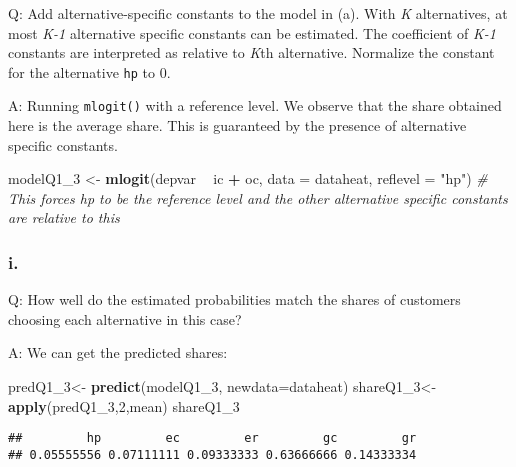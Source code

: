\documentclass[
]{article}
\newenvironment{Shaded}{\begin{snugshade}}{\end{snugshade}}
\newcommand{\CommentTok}[1]{\textcolor[rgb]{0.56,0.35,0.01}{\textit{#1}}}
\newcommand{\DataTypeTok}[1]{\textcolor[rgb]{0.13,0.29,0.53}{#1}}
\newcommand{\DecValTok}[1]{\textcolor[rgb]{0.00,0.00,0.81}{#1}}
\newcommand{\KeywordTok}[1]{\textcolor[rgb]{0.13,0.29,0.53}{\textbf{#1}}}
\newcommand{\NormalTok}[1]{#1}
\newcommand{\OperatorTok}[1]{\textcolor[rgb]{0.81,0.36,0.00}{\textbf{#1}}}
\newcommand{\StringTok}[1]{\textcolor[rgb]{0.31,0.60,0.02}{#1}}
\begin{document}
Q: Add alternative-specific constants to the model in (a). With \emph{K}
alternatives, at most \emph{K-1} alternative specific constants can be
estimated. The coefficient of \emph{K-1} constants are interpreted as
relative to \emph{K}th alternative. Normalize the constant for the
alternative \texttt{hp} to 0.


A: Running \texttt{mlogit()} with a reference level. We observe that the
share obtained here is the average share. This is guaranteed by the
presence of alternative specific constants.

\begin{Shaded}
\begin{Highlighting}[]
\NormalTok{modelQ1_}\DecValTok{3}\NormalTok{ <-}\StringTok{ }\KeywordTok{mlogit}\NormalTok{(depvar }\OperatorTok{~}\StringTok{ }\NormalTok{ic }\OperatorTok{+}\StringTok{ }\NormalTok{oc, }\DataTypeTok{data =}\NormalTok{ dataheat, }\DataTypeTok{reflevel =} \StringTok{"hp"}\NormalTok{)}
\CommentTok{# This forces hp to be the reference level and the other alternative specific constants are relative to this}
\end{Highlighting}
\end{Shaded}

\hypertarget{i.-1}{%
\subsubsection{i.}\label{i.-1}}

Q: How well do the estimated probabilities match the shares of customers
choosing each alternative in this case?

A: We can get the predicted shares:

\begin{Shaded}
\begin{Highlighting}[]
\NormalTok{predQ1_}\DecValTok{3}\NormalTok{<-}\StringTok{ }\KeywordTok{predict}\NormalTok{(modelQ1_}\DecValTok{3}\NormalTok{, }\DataTypeTok{newdata=}\NormalTok{dataheat)}
\NormalTok{shareQ1_}\DecValTok{3}\NormalTok{<-}\StringTok{ }\KeywordTok{apply}\NormalTok{(predQ1_}\DecValTok{3}\NormalTok{,}\DecValTok{2}\NormalTok{,mean)}
\NormalTok{shareQ1_}\DecValTok{3}
\end{Highlighting}
\end{Shaded}

\begin{verbatim}
##         hp         ec         er         gc         gr 
## 0.05555556 0.07111111 0.09333333 0.63666666 0.14333334
\end{verbatim}
\end{document}
